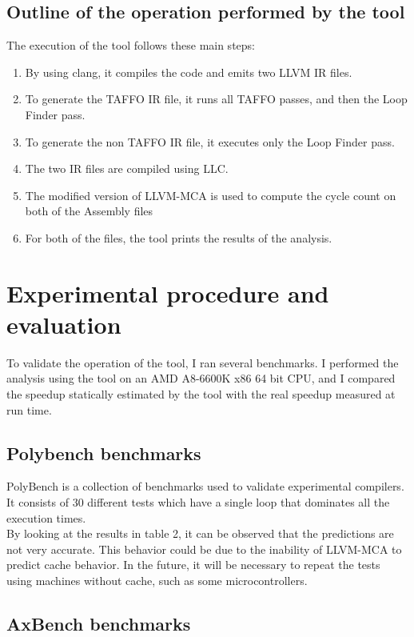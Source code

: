 \subsection{Outline of the operation performed by the tool}
The execution of the tool follows these main steps:
\begin{enumerate}
\item By using clang, it compiles the code and emits two LLVM IR files.
\item To generate the TAFFO IR file, it runs all TAFFO passes, and then the Loop Finder pass.
\item To generate the non TAFFO IR file, it executes only the Loop Finder pass.
\item The two IR files are compiled using LLC.
\item The modified version of LLVM-MCA is used to compute the cycle count on both of the Assembly files
\item For both of the files, the tool prints the results of the analysis.
\end{enumerate}

\section{Experimental procedure and evaluation}
To validate the operation of the tool, I ran several benchmarks.
I performed the analysis using the tool on an AMD A8-6600K x86 64 bit CPU, and I compared the speedup statically estimated by the tool with the real speedup measured at run time.

\subsection{Polybench benchmarks}
PolyBench is a collection of benchmarks used to validate experimental compilers. It consists of 30 different tests which have a single loop that dominates all the execution times. \\
By looking at the results in table 2, it can be observed that the predictions are not very accurate.
This behavior could be due to the inability of LLVM-MCA to predict cache behavior.
In the future, it will be necessary to repeat the tests using machines without cache, such as some microcontrollers.


\subsection{AxBench benchmarks}

